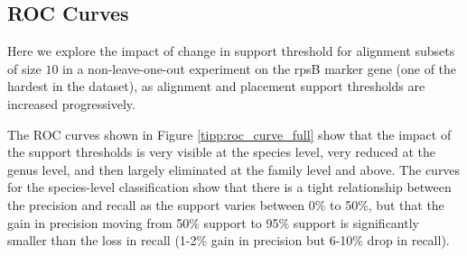 \subsection{ROC Curves}
Here we explore the impact of change in support threshold for
alignment subsets of size $10$ in a non-leave-one-out experiment on
the rpsB marker gene (one of the hardest in the dataset), as
alignment and placement support thresholds are increased progressively.

The ROC curves shown in Figure \ref{tipp:roc_curve_full} show
that the impact of the support thresholds
is very visible at the species level, very reduced at the genus level, and then largely
eliminated at the family level and above.  
The curves for the species-level classification show that there is a tight
 relationship between the precision and recall as the
support varies between 0\% to 50\%, but that
the gain in precision
moving from 50\% support to 95\% support is significantly smaller than
the loss in recall (1-2\% gain in precision but 6-10\% drop in
recall).  

